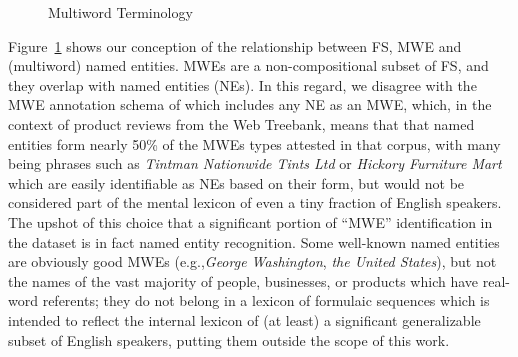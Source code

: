 \documentclass[11pt]{article}
\makeatletter
\def \eg {e.g.,\@ }
\newcommand{\ex}[1]{\textit{#1}\xspace}
\newcommand{\termdef}[1]{\textbf{#1}\xspace}
\newcommand{\figref}[2][]{Figure#1~\ref{#2}\xspace}
\makeatother
\begin{document}
\begin{figure}[!t]
\caption{Multiword Terminology}
\label{fig:terminology}
\end{figure}



\figref{fig:terminology} shows our conception of the relationship between FS, MWE and (multiword) named entities. %
MWEs are a non-compositional subset of FS, and they overlap with named entities (NEs). In this regard, we disagree with the MWE annotation schema of  which includes any NE as an MWE, which, in the context of product reviews from the Web Treebank, means that that named entities form nearly 50\% of the MWEs types attested in that corpus, with many being phrases such as \ex{Tintman Nationwide Tints Ltd} or \ex{Hickory Furniture Mart} which are easily identifiable as NEs based on their form, but would not be considered part of the mental lexicon of even a tiny fraction of English speakers.%
The upshot of this choice that a significant portion of ``MWE'' identification in the dataset is in fact named entity recognition. Some well-known named entities are obviously good MWEs (\eg \ex{George Washington}, \ex{the United States}), but not the names of the vast majority of people, businesses, or products which have real-word referents; they do not belong in a lexicon of formulaic sequences which is intended to reflect the internal lexicon of (at least) a significant generalizable subset of English speakers, putting them outside the scope of this work.
\end{document}
